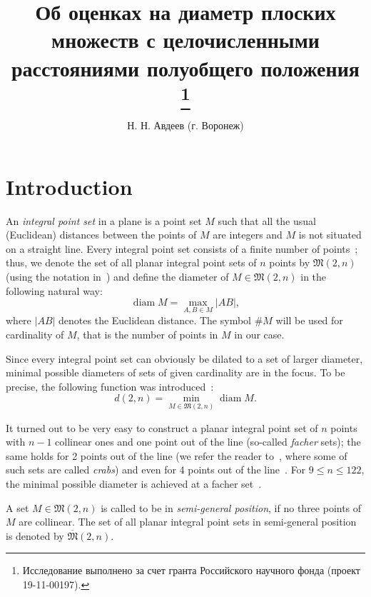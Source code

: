 \documentclass[11pt,twoside,draft
]{article}
\title
{%
Об оценках на диаметр плоских множеств с целочисленными расстояниями полуобщего положения%
\footnote{Исследование выполнено за счет гранта Российского научного фонда (проект 19-11-00197).}}
{%
On diameter bounds for planar integral point sets in semi-general position}
\author
{%
Н. Н. Авдеев (г. Воронеж)}
{%
N. N. Avdeev (Voronezh)}
\theoremstyle{plain}
\begin{document}
\maketitle

\enmaketitle



\section{Introduction}



An \textit{integral point set} in a plane is a point set $M$ such that all the usual (Euclidean) distances between the
points of $M$ are integers and $M$ is not situated on a straight line.
Every integral point set consists of a finite number of points~\cite{anning1945integral,erdos1945integral};
thus, we denote the set of all planar integral point sets of $n$ points by
$\mathfrak{M}(2,n)$ (using the notation in~\cite{our-vmmsh-2018})
and define the diameter of $M\in\mathfrak{M}(2,n)$ in the following natural way:
\begin{equation}
	\operatorname{diam} M = \max_{A,B\in M} |AB|
	,
\end{equation}
where $|AB|$ denotes the Euclidean distance.
The symbol $\# M$ will be used for cardinality of $M$, that is the number of points in $M$ in our case.

Since every integral point set can obviously be dilated to a set of larger diameter,
minimal possible diameters of sets of given cardinality are in the focus.
To be precise,
the following function was introduced~\cite{kurz2008bounds,kurz2008minimum}:
\begin{equation}
	d(2,n) = \min_{M\in\mathfrak{M}(2,n)} \operatorname{diam} M
	.
\end{equation}

It turned out to be very easy to construct a planar integral point set of $n$ points with $n-1$ collinear ones and one point out of the line
(so-called \textit{facher} sets);
the same holds for 2 points out of the line (we refer the reader to~\cite{antonov2008maximal}, where some of such sets are called \textit{crabs})
and even for 4 points out of the line~\cite{huff1948diophantine}.
For $9\leq n\leq 122$, the minimal possible diameter is achieved at a facher set~\cite{kurz2008bounds}.


\begin{definition}
	A set $M\in\mathfrak{M}(2,n)$ is called to be in \textit{semi-general position},
	if no three points of $M$ are collinear.
	The set of all planar integral point sets in semi-general position
	is denoted by $\overline{\mathfrak{M}}(2,n)$.
\end{definition}
\end{document}
